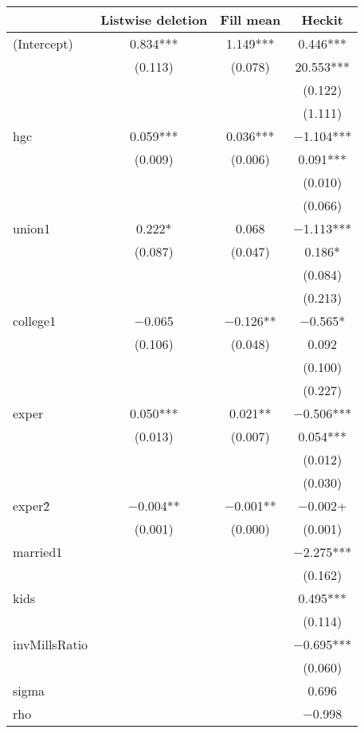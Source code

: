 \documentclass{article}
\begin{document}
\FloatBarrier
\begin{table}[ht]
\centering
\begin{tabular}[t]{lccc}
\toprule
  & Listwise deletion & Fill mean & Heckit\\
\midrule
(Intercept) & \num{0.834}*** & \num{1.149}*** & \num{0.446}***\\
 & (\num{0.113}) & (\num{0.078}) & \num{20.553}***\\
 &  &  & (\num{0.122})\\
 &  &  & (\num{1.111})\\
hgc & \num{0.059}*** & \num{0.036}*** & \num{-1.104}***\\
 & (\num{0.009}) & (\num{0.006}) & \num{0.091}***\\
 &  &  & (\num{0.010})\\
 &  &  & (\num{0.066})\\
union1 & \num{0.222}* & \num{0.068} & \num{-1.113}***\\
 & (\num{0.087}) & (\num{0.047}) & \num{0.186}*\\
 &  &  & (\num{0.084})\\
 &  &  & (\num{0.213})\\
college1 & \num{-0.065} & \num{-0.126}** & \num{-0.565}*\\
 & (\num{0.106}) & (\num{0.048}) & \num{0.092}\\
 &  &  & (\num{0.100})\\
 &  &  & (\num{0.227})\\
exper & \num{0.050}*** & \num{0.021}** & \num{-0.506}***\\
 & (\num{0.013}) & (\num{0.007}) & \num{0.054}***\\
 &  &  & (\num{0.012})\\
 &  &  & (\num{0.030})\\
exper\^2 & \num{-0.004}** & \num{-0.001}** & \num{-0.002}+\\
 & (\num{0.001}) & (\num{0.000}) & (\num{0.001})\\
married1 &  &  & \num{-2.275}***\\
 &  &  & (\num{0.162})\\
kids &  &  & \num{0.495}***\\
 &  &  & (\num{0.114})\\
invMillsRatio &  &  & \num{-0.695}***\\
 &  &  & (\num{0.060})\\
sigma &  &  & \num{0.696}\\
rho &  &  & \num{-0.998}\\

\end{tabular}
\end{table}
\end{document}
